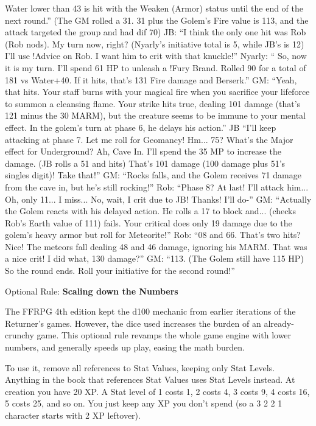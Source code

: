 Water lower than 43 is hit with the Weaken (Armor)
status until the end of the next round.” (The GM rolled a
31. 31 plus the Golem's Fire value is 113, and the attack
targeted the group and had dif 70)
JB: “I think the only one hit was Rob (Rob nods).
My turn now, right? (Nyarly's initiative total is 5, while
JB's is 12) I'll use !Advice on Rob. I want him to crit with
that knuckle!”
Nyarly: “ So, now it is my turn. I'll spend 61 HP
to unleash a !Fury Brand. Rolled 90 for a total of 181 vs
Water+40. If it hits, that's 131 Fire damage and Berserk.”
GM: “Yeah, that hits. Your staff burns with your
magical fire when you sacrifice your lifeforce to summon
a cleansing flame. Your strike hits true, dealing 101
damage (that's 121 minus the 30 MARM), but the
creature seems to be immune to your mental effect. In the
golem's turn at phase 6, he delays his action.”
JB “I'll keep attacking at phase 7. Let me roll for
Geomancy! Hm... 75? What’s the Major effect for
Underground? Ah, Cave In. I'll spend the 35 MP to
increase the damage. (JB rolls a 51 and hits) That's 101
damage (100 damage plus 51's singles digit)! Take that!”
GM: “Rocks falls, and the Golem receives 71
damage from the cave in, but he's still rocking!”
Rob: “Phase 8? At last! I'll attack him... Oh, only
11... I miss... No, wait, I crit due to JB! Thanks! I'll do-”
GM: “Actually the Golem reacts with his delayed
action. He rolls a 17 to block and... (checks Rob's Earth
value of 111) fails. Your critical does only 19 damage due
to the golem's heavy armor but roll for Meteorite!”
Rob: “08 and 66. That's two hits? Nice! The
meteors fall dealing 48 and 46 damage, ignoring his
MARM. That was a nice crit! I did what, 130 damage?”
GM: “113. (The Golem still have 115 HP) So the
round ends. Roll your initiative for the second round!”

Optional Rule: \textbf{Scaling down the Numbers}

The FFRPG 4th edition kept the d100
mechanic from earlier iterations of the
Returner’s games. However, the dice used
increases the burden of an already-crunchy game.
This optional rule revamps the whole game
engine with lower numbers, and generally speeds
up play, easing the math burden.

To use it, remove all references to Stat
Values, keeping only Stat Levels. Anything in the
book that references Stat Values uses Stat Levels
instead. At creation you have 20 XP. A Stat level
of 1 costs 1, 2 costs 4, 3 costs 9, 4 costs 16, 5 costs
25, and so on. You just keep any XP you don't
spend (so a 3 2 2 1 character starts with 2 XP
leftover).

